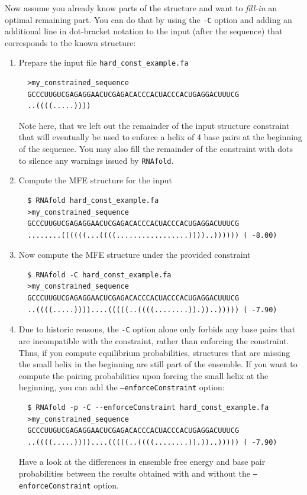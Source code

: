 \documentclass[a4paper]{article}
\begin{document}
Now assume you already know parts of the structure and want to \textit{fill-in}
an optimal remaining part. You can do that by using the \texttt{-C} option
and adding an additional line in dot-bracket notation to the input (after the sequence)
that corresponds to the known structure:
\begin{enumerate}
\item Prepare the input file \texttt{hard\_const\_example.fa}
\begin{verbatim}
  >my_constrained_sequence
  GCCCUUGUCGAGAGGAACUCGAGACACCCACUACCCACUGAGGACUUUCG
  ..((((.....))))
\end{verbatim}
  Note here, that we left out the remainder of the input structure constraint that will
  eventually be used to enforce a helix of 4 base pairs at the beginning of the sequence.
  You may also fill the remainder of the constraint with dots to silence any warnings issued
  by \texttt{RNAfold}.
\item Compute the MFE structure for the input
\begin{verbatim}
  $ RNAfold hard_const_example.fa
  >my_constrained_sequence
  GCCCUUGUCGAGAGGAACUCGAGACACCCACUACCCACUGAGGACUUUCG
  ........((((((...((((.................))))..)))))) ( -8.00)
\end{verbatim}
\item Now compute the MFE structure under the provided constraint
\begin{verbatim}
  $ RNAfold -C hard_const_example.fa
  >my_constrained_sequence
  GCCCUUGUCGAGAGGAACUCGAGACACCCACUACCCACUGAGGACUUUCG
  ..((((.....))))....(((((..((((........)).))..))))) ( -7.90)
\end{verbatim}
\item Due to historic reasons, the \texttt{-C} option alone only forbids any base pairs
that are incompatible with the constraint, rather than enforcing the constraint. Thus,
if you compute equilibrium probabilities, structures that are missing the small helix in
the beginning are still part of the ensemble. If you want to compute the pairing probabilities
upon forcing the small helix at the beginning, you can add the \texttt{--enforceConstraint} option:
\begin{verbatim}
  $ RNAfold -p -C --enforceConstraint hard_const_example.fa
  >my_constrained_sequence
  GCCCUUGUCGAGAGGAACUCGAGACACCCACUACCCACUGAGGACUUUCG
  ..((((.....))))....(((((..((((........)).))..))))) ( -7.90)
\end{verbatim}
  Have a look at the differences in ensemble free energy and base pair probabilities between
  the results obtained with and without the \texttt{--enforceConstraint} option.
\end{enumerate}
\end{document}
